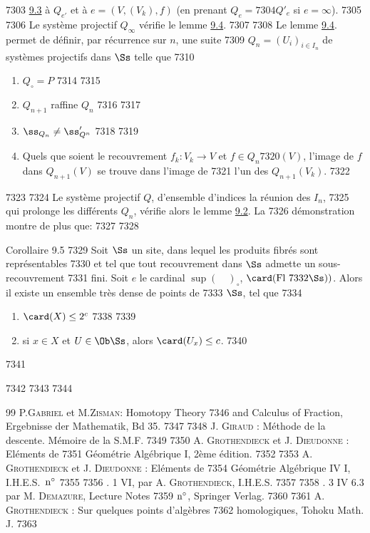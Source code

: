   7303	\hyperref[VI.lem9.3]{9.3} à $Q_{e'}$ et à $e = (V, (V_k), f)$ (\resp en prenant $Q_e =
  7304	Q'_e$ si $e = \infty$).
  7305	
  7306	Le système projectif $Q_{\infty}$ vérifie le lemme \hyperref[VI.lem9.4]{9.4}.
  7307	
  7308	Le lemme \hyperref[VI.lem9.4]{9.4}. permet de définir, par récurrence sur $n$, une suite
  7309	$Q_n = (U_i)_{i \in I_n}$ de systèmes projectifs dans $\Ss$ telle que
  7310	\begin{enumerate}
  7311	\renewcommand{\theenumi}{\roman{enumi}}
  7312	\renewcommand{\labelenumi}{(\theenumi)}
  7313	\item $Q_\circ = P$
  7314	
  7315	\item $Q_{n+1}$ raffine $Q_n$
  7316	
  7317	\item $\ss_{Q_n} \neq \ss'_{Q^n}$
  7318	
  7319	\item Quels que soient le recouvrement $f_k : V_k \to V$ et $f \in Q_n
  7320	  (V)$, l'image de $f$ dans $Q_{n+1} (V)$ se trouve dans l'image de
  7321	  l'un des $Q_{n+1} (V_k)$.
  7322	\end{enumerate}
  7323	
  7324	Le système projectif $Q$, d'ensemble d'indices la réunion des $I_n$,
  7325	qui prolonge les différents $Q_n$, vérifie alors le lemme \hyperref[VI.lem9.2]{9.2}. La
  7326	démonstration montre de plus que:
  7327	
  7328	\begin{enonce*}{Corollaire 9.5}
  7329	Soit $\Ss$ un site, dans lequel les produits fibrés sont représentables
  7330	et tel que tout recouvrement dans $\Ss$ admette un sous-recouvrement
  7331	fini. Soit $e$ le cardinal $\sup(\quad)_{\circ}$, $\card(\text{\rm Fl }
  7332	\Ss))$. Alors il existe un ensemble très dense de points de
  7333	$\Ss$, tel que
  7334	\begin{enumerate}
  7335	\renewcommand{\theenumi}{\roman{enumi}}
  7336	\renewcommand{\labelenumi}{(\theenumi)}
  7337	\item $\card(X) \leq 2^c$
  7338	
  7339	\item si $x \in X$ et $U \in \Ob \Ss$, alors $\card(U_x) \leq c$.
  7340	\end{enumerate}
  7341	\end{enonce*}
  7342	
  7343	
  7344	\begin{thebibliography}{99}	 P.\textsc{Gabriel} et M.\textsc{Zisman}: Homotopy Theory
  7346	  and Calculus   of Fraction, Ergebnisse der Mathematik, Bd 35.
  7347	
  7348	 J. \textsc{Giraud} : Méthode de la descente. Mémoire de la S.M.F.
  7349	
  7350	 A. \textsc{Grothendieck} et J. \textsc{Dieudonne} : Eléments de
  7351	  Géométrie Algébrique I, 2ème édition.
  7352	
  7353	 A. \textsc{Grothendieck} et J. \textsc{Dieudonne} : Eléments de
  7354	  Géométrie Algébrique IV I, I.H.E.S.~${\rm n^{\circ}}$
  7355	
  7356	 \SGA. 1 VI, par A. \textsc{Grothendieck}, I.H.E.S.
  7357	
  7358	 \SGA. 3 IV 6.3 par M. \textsc{Demazure}, Lecture Notes
  7359	  ${\rm n^{\circ}}$, Springer Verlag.
  7360	
  7361	 A. \textsc{Grothendieck} : Sur quelques points d'algèbres
  7362	  homologiques, Tohoku Math. J.
  7363	\end{thebibliography}
